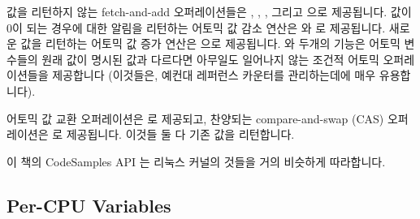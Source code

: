값을 리턴하지 않는 fetch-and-add 오퍼레이션들은 ,
, , 그리고  으로 제공됩니다.
값이 0이 되는 경우에 대한 알림을 리턴하는 어토믹 값 감소 연산은
 와  로 제공됩니다.
새로운 값을 리턴하는 어토믹 값 증가 연산은  으로
제공됩니다.
 와  두개의 기능은 어토믹
변수들의 원래 값이 명시된 값과 다르다면 아무일도 일어나지 않는 조건적 어토믹
오퍼레이션들을 제공합니다 (이것들은, 예컨대 레퍼런스 카운터를 관리하는데에 매우
유용합니다).

어토믹 값 교환 오퍼레이션은  로 제공되고, 찬양되는
compare-and-swap (CAS) 오퍼레이션은  로 제공됩니다.
이것들 둘 다 기존 값을 리턴합니다.

이 책의 CodeSamples API 는 리눅스 커널의 것들을 거의 비슷하게 따라합니다.

\subsection{Per-CPU Variables}
\label{sec:toolsoftrade:Per-CPU Variables}

